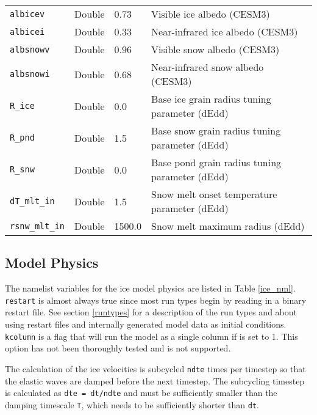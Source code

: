 \begin{table}
\begin{center}
\begin{tabular}{p{3cm}p{2.0cm}p{3cm}p{6.5cm}}
{\tt albicev} &  Double & 0.73 &  Visible ice albedo (CESM3)\\

{\tt albicei} &  Double & 0.33 &  Near-infrared ice albedo (CESM3)\\

{\tt albsnowv} &  Double & 0.96 &  Visible snow albedo (CESM3)\\

{\tt albsnowi} &  Double & 0.68 &  Near-infrared snow albedo (CESM3)\\

{\tt R\_ice} &  Double & 0.0 &  Base ice grain radius tuning parameter (dEdd)\\

{\tt R\_pnd} &  Double & 1.5 &  Base snow grain radius tuning parameter (dEdd)\\

{\tt R\_snw} &  Double & 0.0 &  Base pond grain radius tuning parameter (dEdd)\\

{\tt dT\_mlt\_in} &  Double & 1.5 & Snow melt onset temperature parameter (dEdd)\\

{\tt rsnw\_mlt\_in} &  Double & 1500.0 & Snow melt maximum radius (dEdd)\\

  \hline
  \end{tabular}
  \end{center}
\end{table}

\subsection{Model Physics}

The namelist variables for the ice model physics are listed in Table 
\ref{ice_nml}.  {\tt restart} is almost always true since most
run types begin by reading in a binary restart file.  See section 
\ref{runtypes} for a description of the run types and about using
restart files and internally generated model data as initial conditions.
{\tt kcolumn} is a flag that will run the model as a single column if is
set to 1.  This option has not been thoroughly tested and is not supported. 

The calculation of the ice velocities is subcycled {\tt ndte} times per
timestep so that the elastic waves are damped before the next timestep. The
subcycling timestep is calculated as {\tt dte = dt/ndte}
and must be sufficiently smaller than the damping timescale {\tt T},
which needs to be sufficiently shorter than {\tt dt}.

